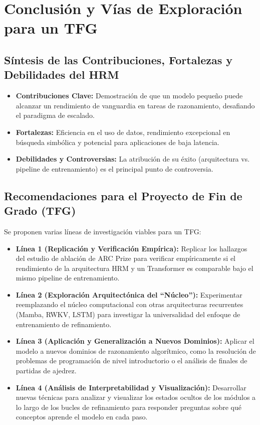\documentclass{article}
\begin{document}
	\section{Conclusión y Vías de Exploración para un TFG}
	
	\subsection{Síntesis de las Contribuciones, Fortalezas y Debilidades del HRM}
	\begin{itemize}
		\item \textbf{Contribuciones Clave:} Demostración de que un modelo pequeño puede alcanzar un rendimiento de vanguardia en tareas de razonamiento, desafiando el paradigma de escalado.
		\item \textbf{Fortalezas:} Eficiencia en el uso de datos, rendimiento excepcional en búsqueda simbólica y potencial para aplicaciones de baja latencia.
		\item \textbf{Debilidades y Controversias:} La atribución de su éxito (arquitectura vs. pipeline de entrenamiento) es el principal punto de controversia.
	\end{itemize}
	
	\subsection{Recomendaciones para el Proyecto de Fin de Grado (TFG)}
	Se proponen varias líneas de investigación viables para un TFG:
	\begin{itemize}[leftmargin=*]
		\item \textbf{Línea 1 (Replicación y Verificación Empírica):} Replicar los hallazgos del estudio de ablación de ARC Prize para verificar empíricamente si el rendimiento de la arquitectura HRM y un Transformer es comparable bajo el mismo pipeline de entrenamiento.
		\item \textbf{Línea 2 (Exploración Arquitectónica del ``Núcleo''):} Experimentar reemplazando el núcleo computacional con otras arquitecturas recurrentes (Mamba, RWKV, LSTM) para investigar la universalidad del enfoque de entrenamiento de refinamiento.
		\item \textbf{Línea 3 (Aplicación y Generalización a Nuevos Dominios):} Aplicar el modelo a nuevos dominios de razonamiento algorítmico, como la resolución de problemas de programación de nivel introductorio o el análisis de finales de partidas de ajedrez.
		\item \textbf{Línea 4 (Análisis de Interpretabilidad y Visualización):} Desarrollar nuevas técnicas para analizar y visualizar los estados ocultos de los módulos a lo largo de los bucles de refinamiento para responder preguntas sobre qué conceptos aprende el modelo en cada paso.
	\end{itemize}
	
\end{document}
